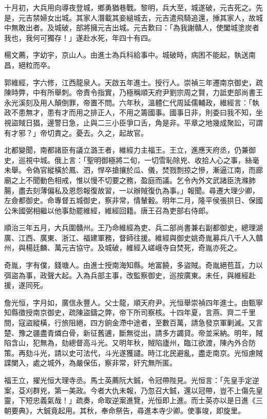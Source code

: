 \begin{pinyinscope}
十月初，大兵用向導夜登城，鄉勇猶巷戰。黎明，兵大至，城遂破，元吉死之。先是，元吉禁婦女出城。其家人潛載其妾縋城去，元吉遣飛騎追還，捶其家人，故城中無敢出者。及城破，部將擁元吉出城。元吉歎曰：「為我謝贛人，使闔城塗炭者我也，我何可獨存！」遂赴水死，年四十有四。

楊文薦，字幼宇，京山人。由進士為兵科給事中。城破時，病困不能起，執送南昌，絕粒而卒。

郭維經，字六修，江西龍泉人。天啟五年進士。授行人。崇禎三年遷南京御史，疏陳時弊，中有所舉刺。帝責令指實，乃極稱順天府尹劉宗周之賢，力詆吏部尚書王永光溪刻及用人顛倒罪，帝置不問。六年秋，溫體仁代周延儒輔政，維經言：「執政不患無才，患有才而用之排正人，不用之籌國事。國事日非，則委曰我不知，坐視盜賊日猖，邊警日急，止與二三小臣爭口舌，角是非。平章之地幾成聚訟，可謂有才邪？」帝切責之。憂去。久之，起故官。

北都變聞，南都諸臣有議立潞王者，維經力主福王。王立，進應天府丞，仍兼御史，巡視中城。俄上言：「聖明御極將二旬，一切雪恥除兇、收拾人心之事，絲毫未舉。令偽官縱橫於鳳、泗，悍卒搶攘於瓜、儀，焚戮剽掠之慘，漸逼江南，而廊廟之上不聞動色相戒，惟以慢不切要之務，盈庭而議。乞令內外文武諸臣洗滌肺腸，盡去刻薄偏私及恩怨報復故習，一以辦賊復仇為事。」報聞。尋遷大理少卿，左僉都御史。命專督五城御史，察非常，情輦轂。明年二月，隆平侯張拱日、保國公朱國弼相繼以他事劾罷維經，維經回籍。唐王召為吏部右侍郎。

順治三年五月，大兵圍贛州。王乃命維經為吏、兵二部尚書兼右副都御史，總理湖廣、江西、廣東、浙江、福建軍務，督師往援。維經與御史姚奇胤募兵八千人入贛州，與楊廷麟、萬元吉協守。及城破，維經入嵯峨寺自焚死，奇胤亦死之。

奇胤，字有僕，錢塘人。由進士授南海知縣。地富饒，多盜賊。奇胤絕苞苴，力以弭盜為事，政聲大起。入為兵部主事，改監察御史，巡按廣東。未任，與維經赴援，遂同死。

詹光恒，字月如，廣信永豐人。父士龍，順天府尹。光恒舉崇禎四年進士。由甄寧知縣徵授南京御史，疏陳盜鑄之弊，帝下所司察核。十四年夏，言燕、齊二千里間，寇盜縱橫，行旅阻絕，四方餉金滯中途者，至數百萬，請急發京軍剿滅。又言楚、豫之疆盡青燐白骨，新征舊逋，斷無從出，請多方蠲貸。帝並采納。明年，賊陷含山，犯無為，劾總督高斗光。又明年秋，賊陷廬州，臨江欲渡，陳內外合防策。再劾斗光，請以史可法代，斗光遂獲譴。時江北民避亂，盡走南京。光恒慮賊諜闌入，處之城外，為嚴保伍，察非常，奸宄無所匿。

福王立，擢光恒大理寺丞。馬士英薦阮大鋮，令冠帶陛見。光恒言：「先皇手定逆案，芟刈群兇，第一美政。今者大仇未報，乃忽召大鋮，還以冠帶，豈不上傷先皇靈，下短忠義氣哉！」疏奏，命取逆案進覽，光恒即上進。而士英亦以是日進《三朝要典》，大鋮竟起用。其秋，奉命祭告，尋進本寺少卿。使事竣，即旋里。


\end{pinyinscope}
